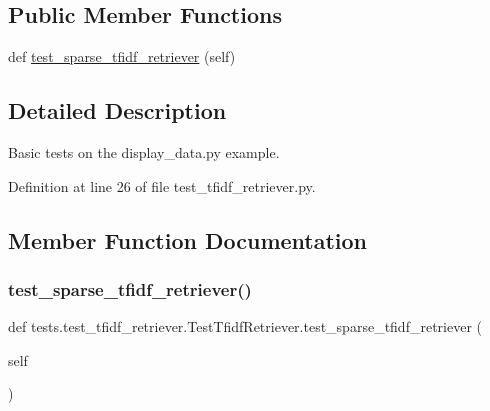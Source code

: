 \subsection*{Public Member Functions}
\begin{DoxyCompactItemize}
\item 
def \hyperlink{classtests_1_1test__tfidf__retriever_1_1TestTfidfRetriever_ad323cddfeb021a3b38a7eb4810d6ecdd}{test\+\_\+sparse\+\_\+tfidf\+\_\+retriever} (self)
\end{DoxyCompactItemize}


\subsection{Detailed Description}
\begin{DoxyVerb}Basic tests on the display_data.py example.
\end{DoxyVerb}
 

Definition at line 26 of file test\+\_\+tfidf\+\_\+retriever.\+py.



\subsection{Member Function Documentation}
\mbox{\label{classtests_1_1test__tfidf__retriever_1_1TestTfidfRetriever_ad323cddfeb021a3b38a7eb4810d6ecdd}} 
\subsubsection{\texorpdfstring{test\+\_\+sparse\+\_\+tfidf\+\_\+retriever()}{test\_sparse\_tfidf\_retriever()}}
{\footnotesize\ttfamily def tests.\+test\+\_\+tfidf\+\_\+retriever.\+Test\+Tfidf\+Retriever.\+test\+\_\+sparse\+\_\+tfidf\+\_\+retriever (\begin{DoxyParamCaption}\item[{}]{self }\end{DoxyParamCaption})}



